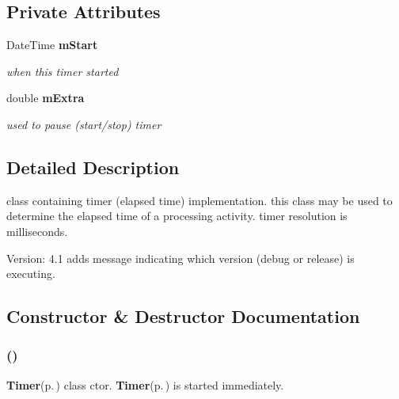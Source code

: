 \subsection*{Private Attributes}
\begin{CompactItemize}
\item 
Date\-Time {\bf m\-Start}
\begin{CompactList}\small\item\em when this timer started \item\end{CompactList}\item 
double {\bf m\-Extra}
\begin{CompactList}\small\item\em used to pause (start/stop) timer \item\end{CompactList}\end{CompactItemize}


\subsection{Detailed Description}
class containing timer (elapsed time) implementation. this class may be used to determine the elapsed time of a processing activity. timer resolution is milliseconds. 

\begin{Desc}
\item[Version:]4.1 adds message indicating which version (debug or release) is executing. \end{Desc}




\subsection{Constructor \& Destructor Documentation}
\subsubsection{ ()}\label{class_c_s_image_viewer_1_1_timer_6a8bc5014802d569f6d01c4f36121a81}


{\bf Timer}{\rm (p.\,\pageref{class_c_s_image_viewer_1_1_timer})} class ctor. {\bf Timer}{\rm (p.\,\pageref{class_c_s_image_viewer_1_1_timer})} is started immediately. 

